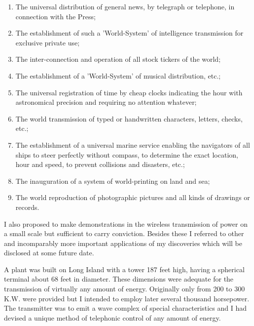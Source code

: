 \documentclass[a4paper,12pt,english,twoside,openright]{memoir}
\begin{document}
{\begin{enumerate}[(1)]
\item The universal distribution of general news, by telegraph or telephone, in connection with the 
Press;

\item The establishment of such a 'World-System' of intelligence transmission for exclusive private 
use;

\item The inter-connection and operation of all stock tickers of the world;

\item The establishment of a 'World-System' of musical distribution, etc.;

\item The universal registration of time by cheap clocks indicating the hour with astronomical 
precision and requiring no attention whatever;

\item The world transmission of typed or handwritten characters, letters, checks, etc.;

\item The establishment of a universal marine service enabling the navigators of all ships to steer 
perfectly without compass, to determine the exact location, hour and speed, to prevent collisions 
and disasters, etc.;

\item The inauguration of a system of world-printing on land and sea;

\item The world reproduction of photographic pictures and all kinds of drawings or records.
\end{enumerate}
}

I also proposed to make demonstrations in the wireless transmission of power on a small scale 
but sufficient to carry conviction.  Besides these I referred to other and incomparably more 
important applications of my discoveries which will be disclosed at some future date.  

A plant was built on Long Island with a tower 187 feet high, having a spherical terminal about 68 
feet in diameter.  These dimensions were adequate for the transmission of virtually any amount of 
energy.  Originally only from 200 to 300 K.W. were provided but I intended to employ later several 
thousand horsepower.  The transmitter was to emit a wave complex of special characteristics and 
I had devised a unique method of telephonic control of any amount of energy.  
\end{document}
